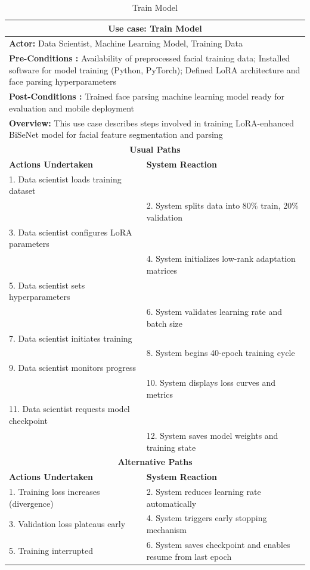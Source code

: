 \documentclass[12pt,a4paper]{report}
\begin{document}
\begin{table}[H]
\centering
\caption{Train Model}
\begin{tabular}{|p{6cm}|p{6cm}|}
\hline
\multicolumn{2}{|c|}{\textbf{Use case: Train Model}} \\
\hline
\multicolumn{2}{|p{12cm}|}{\textbf{Actor:} Data Scientist, Machine Learning Model, Training Data} \\
\hline
\multicolumn{2}{|p{12cm}|}{\textbf{Pre-Conditions :} Availability of preprocessed facial training data; Installed software for model training (Python, PyTorch); Defined LoRA architecture and face parsing hyperparameters} \\
\hline
\multicolumn{2}{|p{12cm}|}{\textbf{Post-Conditions :} Trained face parsing machine learning model ready for evaluation and mobile deployment} \\
\hline
\multicolumn{2}{|p{12cm}|}{\textbf{Overview:} This use case describes steps involved in training LoRA-enhanced BiSeNet model for facial feature segmentation and parsing} \\
\hline
\multicolumn{2}{|c|}{\textbf{Usual Paths}} \\
\hline
\textbf{Actions Undertaken} & \textbf{System Reaction} \\
\hline
1. Data scientist loads training dataset & \\
\hline
 & 2. System splits data into 80\% train, 20\% validation \\
\hline
3. Data scientist configures LoRA parameters & \\
\hline
 & 4. System initializes low-rank adaptation matrices \\
\hline
5. Data scientist sets hyperparameters & \\
\hline
 & 6. System validates learning rate and batch size \\
\hline
7. Data scientist initiates training & \\
\hline
 & 8. System begins 40-epoch training cycle \\
\hline
9. Data scientist monitors progress & \\
\hline
 & 10. System displays loss curves and metrics \\
\hline
11. Data scientist requests model checkpoint & \\
\hline
 & 12. System saves model weights and training state \\
\hline
\multicolumn{2}{|c|}{\textbf{Alternative Paths}} \\
\hline
\textbf{Actions Undertaken} & \textbf{System Reaction} \\
\hline
1. Training loss increases (divergence) & 2. System reduces learning rate automatically \\
\hline
3. Validation loss plateaus early & 4. System triggers early stopping mechanism \\
\hline
5. Training interrupted & 6. System saves checkpoint and enables resume from last epoch \\
\hline
\end{tabular}
\end{table}
\end{document}
